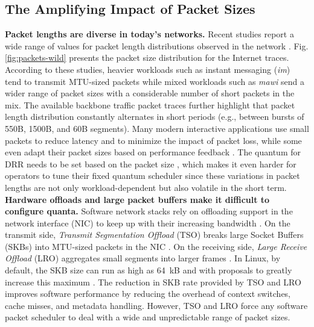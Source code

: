 \subsection{The Amplifying Impact of Packet Sizes}
\textbf{Packet lengths are diverse in today's networks.}
Recent studies report a wide range of
values for packet length distributions observed in the network
\cite{social,high-resolution,wild,caida,im}. Fig. \ref{fig:packets-wild}
presents the packet size distribution for the Internet traces.
According to these studies, heavier workloads such as instant
messaging (\textit{im}) tend to transmit MTU-sized packets while mixed
workloads such as \textit{mawi} send a wider range of packet sizes
with a considerable number of short packets in the mix.  The available
backbone traffic packet traces \cite{caida} further highlight that
packet length distribution constantly alternates in short periods
(e.g., between bursts of 550B, 1500B, and 60B segments).  Many modern
interactive applications use small packets to reduce latency and to
minimize the impact of packet loss, while some even adapt their packet
sizes based on performance feedback \cite{webrtc-teams, zoom-quality}.
The quantum for DRR needs to be set based on the packet size \cite {drr},
which makes it even harder for operators to tune their fixed
quantum scheduler since these variations in packet lengths are not
only workload-dependent but also volatile in the short term.
\\
\textbf{Hardware offloads and large packet buffers make it difficult to configure quanta.}
Software network stacks rely on offloading support in the
network interface (NIC) to keep up with their increasing bandwidth
\cite{overheads}. On the transmit side, \textit{Transmit Segmentation
Offload} (TSO) breaks large Socket Buffers (SKBs) into MTU-sized packets in
the NIC \cite{linux-gso-gro}. On the receiving side, \textit{Large
Receive Offload} (LRO) aggregates small segments into
larger frames \cite{linux-gso-gro}. In Linux, by default, the SKB size
can run as high as 64~kB and with proposals to greatly increase
this maximum \cite{big-tcp}. The reduction in SKB rate provided by TSO
and LRO improves software performance by reducing the overhead of
context switches, cache misses, and metadata handling. However, TSO
and LRO force any software packet scheduler to deal with a wide and unpredictable range of packet sizes.




